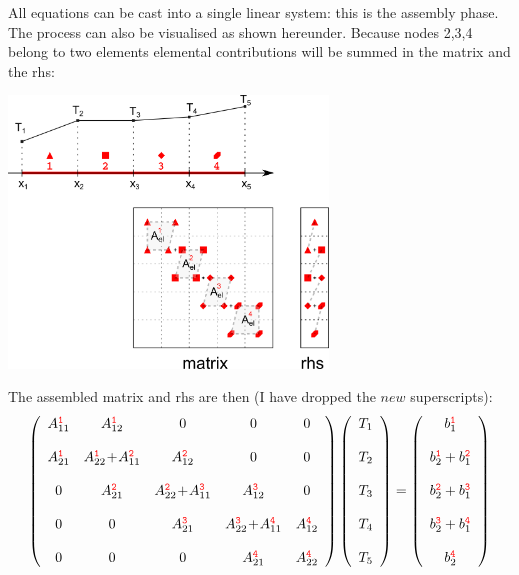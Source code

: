 All equations can be cast into a single linear system: this is the {\color{olive} assembly} phase.
The process can also be visualised as shown hereunder. Because nodes 2,3,4 belong to two elements 
elemental contributions will be summed in the matrix and the rhs:
\begin{center}
\includegraphics[width=8.5cm]{images/oneD/assembly}
\end{center}
The assembled matrix and rhs are then (I have dropped the $new$ superscripts):
\[
\left(
\begin{array}{ccccc}
A_{11}^{{\color{red}\tt 1}} &  A_{12}^{{\color{red}\tt 1}} &0&0&0 \\ \\ 
A_{21}^{{\color{red}\tt 1}} &  A_{22}^{{\color{red} \tt 1}} \!+\! A_{11}^{{\color{red}\tt 2}}  & A_{12}^{{\color{red}\tt 2}}   &0&0 \\ \\
0& A_{21}^{{\color{red}\tt 2}} & A_{22}^{{\color{red} \tt 2}} \! +\! A_{11}^{{\color{red}\tt 3}}  & A_{12}^{{\color{red}\tt 3}}   & 0\\ \\
0&0& A_{21}^{{\color{red}\tt 3}}   & A_{22}^{{\color{red}\tt 3}} \! +\! A_{11}^{{\color{red}\tt 4}}   & A_{12}^{{\color{red}\tt 4}}  \\ \\
0&0&0& A_{21}^{{\color{red}\tt 4}}   & A_{22}^{{\color{red}\tt 4}} 
\end{array}
\right)
\left(
\begin{array}{c}
T_1 \\\\ T_2 \\\\ T_3 \\\\ T_4 \\\\ T_5
\end{array}
\right)
=
\left(
\begin{array}{c}
b_{1}^{{\color{red}\tt 1}} \\ \\
b_{2}^{{\color{red}\tt 1}} + b_{1}^{{\color{red}\tt 2}}\\ \\
b_{2}^{{\color{red}\tt 2}} + b_{1}^{{\color{red}\tt 3}}\\ \\
b_{2}^{{\color{red}\tt 3}} + b_{1}^{{\color{red}\tt 4}}\\ \\
b_{2}^{{\color{red}\tt 4}} 
\end{array}
\right)
\]
